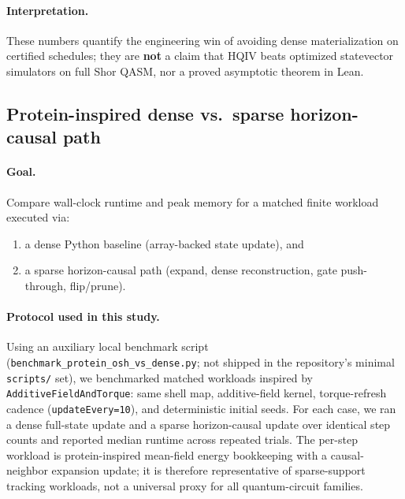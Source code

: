 \documentclass[11pt,a4paper]{article}
\theoremstyle{remark}
\begin{document}
\paragraph{Interpretation.}
These numbers quantify the engineering win of avoiding dense materialization on certified schedules; they are \textbf{not} a claim that HQIV beats optimized statevector simulators on full Shor QASM, nor a proved asymptotic theorem in Lean.

\subsection{Protein-inspired dense vs.\ sparse horizon-causal path}
\label{sec:benchmark-protein}

\paragraph{Goal.}
Compare wall-clock runtime and peak memory for a matched finite workload executed via:
\begin{enumerate}
  \item a dense Python baseline (array-backed state update), and
  \item a sparse horizon-causal path (expand, dense reconstruction, gate push-through, flip/prune).
\end{enumerate}

\paragraph{Protocol used in this study.}
Using an auxiliary local benchmark script (\texttt{benchmark\_protein\_osh\_vs\_dense.py}; not shipped in the repository's minimal \texttt{scripts/} set), we benchmarked matched workloads inspired by \texttt{AdditiveFieldAndTorque}: same shell map, additive-field kernel, torque-refresh cadence (\texttt{updateEvery=10}), and deterministic initial seeds. For each case, we ran a dense full-state update and a sparse horizon-causal update over identical step counts and reported median runtime across repeated trials.
The per-step workload is protein-inspired mean-field energy bookkeeping with a causal-neighbor expansion update; it is therefore representative of sparse-support tracking workloads, not a universal proxy for all quantum-circuit families.
\end{document}
